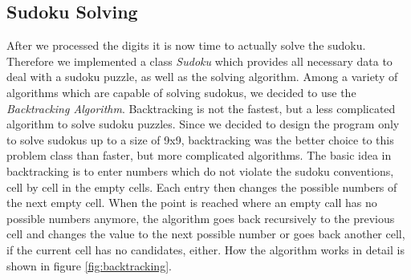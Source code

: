 \documentclass[
a4paper,     %
12pt         %
]{scrartcl}  %
\begin{document}
\subsection{Sudoku Solving}
After we processed the digits it is now time to actually solve the sudoku. Therefore we 
implemented a class \emph{Sudoku} which provides all necessary data to deal with a sudoku puzzle, 
as well as the solving algorithm. Among a variety of algorithms which are capable of solving sudokus,
we decided to use the \emph{Backtracking Algorithm}. Backtracking is not the fastest,
but a less complicated algorithm to solve sudoku puzzles. Since we decided to design the program 
only to solve sudokus up to a size of 9x9, backtracking was the better choice to this problem class than faster,
but more complicated algorithms. \newline \newline The basic idea in backtracking is to enter numbers which
do not violate the sudoku conventions, cell by cell in the empty cells. Each entry then changes
the possible numbers of the next empty cell. When the point is reached where an empty call has no 
possible numbers anymore, the algorithm goes back recursively to the previous cell and changes the value to
the next possible number or goes back another cell, if the current cell has no candidates, either.
How the algorithm works in detail is shown in figure \ref{fig:backtracking}.
\end{document}
